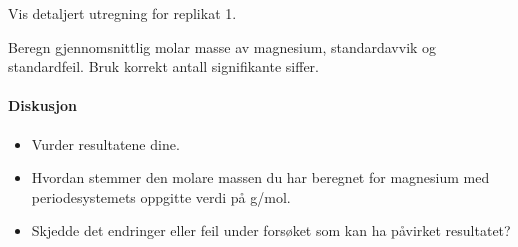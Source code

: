 \documentclass[12pt, a4]{article}
\begin{document}
	Vis detaljert utregning for replikat 1.
	
	Beregn gjennomsnittlig molar masse av magnesium, standardavvik og standardfeil. Bruk korrekt antall signifikante siffer.
	
	\paragraph{Diskusjon}
	\begin{itemize}
		\item Vurder resultatene dine.
		
		\item Hvordan stemmer den molare massen du har beregnet for magnesium med periodesystemets oppgitte verdi på \unit[24,31]{g/mol}.
		
		\item Skjedde det endringer eller feil under forsøket som kan ha påvirket resultatet?
	\end{itemize}
	
	
	
\end{document}
